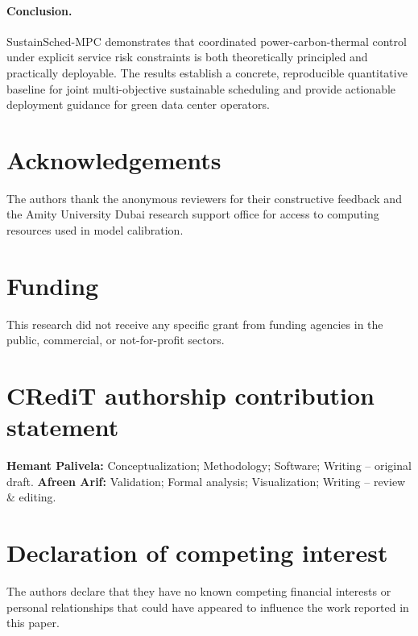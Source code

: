 \documentclass[a4paper,fleqn]{cas-dc}
\begin{document}
\paragraph{Conclusion.}
SustainSched-MPC demonstrates that coordinated power-carbon-thermal control under explicit service risk constraints is both theoretically principled and practically deployable. The results establish a concrete, reproducible quantitative baseline for joint multi-objective sustainable scheduling and provide actionable deployment guidance for green data center operators.

\section*{Acknowledgements}
The authors thank the anonymous reviewers for their constructive feedback and the Amity University Dubai research support office for access to computing resources used in model calibration.

\section*{Funding}
This research did not receive any specific grant from funding agencies in the public, commercial, or not-for-profit sectors.

\section*{CRediT authorship contribution statement}
\textbf{Hemant Palivela:} Conceptualization; Methodology; Software; Writing -- original draft.
\textbf{Afreen Arif:} Validation; Formal analysis; Visualization; Writing -- review \& editing.

\section*{Declaration of competing interest}
The authors declare that they have no known competing financial interests or personal relationships that could have appeared to influence the work reported in this paper.
\end{document}
